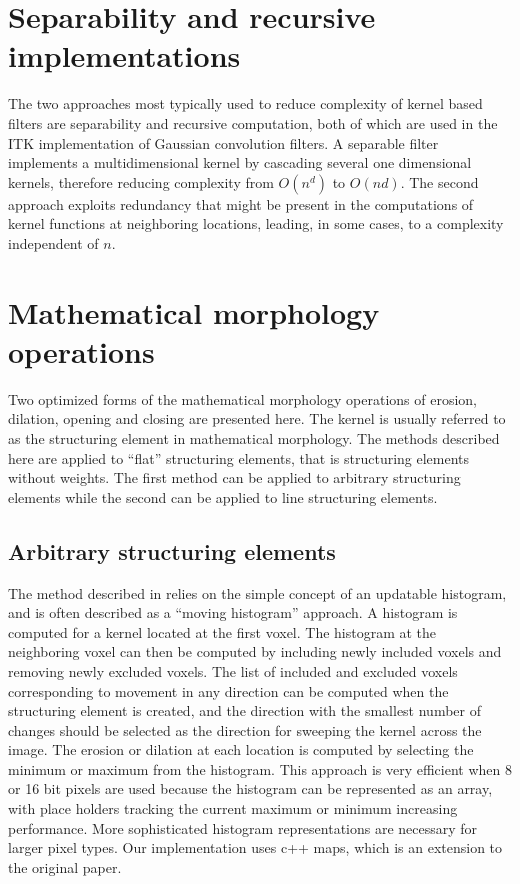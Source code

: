 \documentclass{InsightArticle}
\begin{document}
\section{Separability and recursive implementations}
The two approaches most typically used to reduce complexity of kernel
based filters are separability and recursive computation, both of
which are used in the ITK implementation of Gaussian convolution
filters. A separable filter implements a multidimensional kernel by
cascading several one dimensional kernels, therefore reducing
complexity from $O(n^d)$ to $O(nd)$. The second approach exploits
redundancy that might be present in the computations of kernel
functions at neighboring locations, leading, in some cases, to a complexity
independent of $n$.

\section{Mathematical morphology operations}
Two optimized forms of the mathematical morphology operations of
erosion, dilation, opening and closing are presented here. The kernel
is usually referred to as the structuring element in mathematical
morphology. The methods described here are applied to ``flat''
structuring elements, that is structuring elements without
weights. The first method can be applied to arbitrary structuring
elements while the second can be applied to line structuring elements.

\subsection{Arbitrary structuring elements}
\label{sect:MMmovingHist}
The method described in \cite{Vandroogenbroeck96.3} relies on the
simple concept of an updatable histogram, and is often described as a
``moving histogram'' approach. A histogram is computed for a kernel
located at the first voxel. The histogram at the neighboring voxel can
then be computed by including newly included voxels and removing newly
excluded voxels. The list of included and excluded voxels
corresponding to movement in any direction can be computed when the
structuring element is created, and the direction with the smallest
number of changes should be selected as the direction for sweeping the
kernel across the image. The erosion or dilation at each location is
computed by selecting the minimum or maximum from the histogram. This
approach is very efficient when 8 or 16 bit pixels are used because
the histogram can be represented as an array, with place holders
tracking the current maximum or minimum increasing performance. More
sophisticated histogram representations are necessary for larger pixel
types. Our implementation uses c++ maps, which is an extension to the
original paper.
\end{document}

